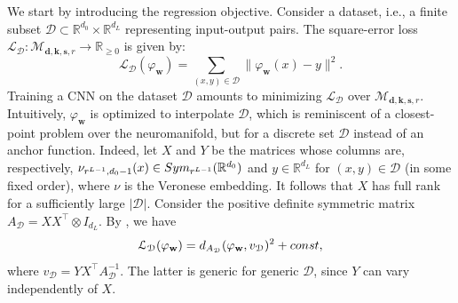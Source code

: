 \documentclass[twoside]{article}
\theoremstyle{plain}%
\theoremstyle{definition}
\theoremstyle{remark}
\newcommand{\symm}[2]{\textnormal{Sym}_{#1}(\mathbb{R}^{#2})}
\begin{document}
We start by introducing the regression objective. Consider a dataset, i.e., a finite subset $\mathcal{D} \subset \mathbb{R}^{d_0} \times \mathbb{R}^{d_L}$ representing input-output pairs. The square-error loss $\mathcal{L}_{\mathcal{D}}\colon \mathcal{M}_{\mathbf{d}, \mathbf{k}, \mathbf{s}, r} \rightarrow \mathbb{R}_{\geq 0}$ is given by: 
\begin{equation}
    \label{eq:loss}
    \mathcal{L}_\mathcal{D}(\varphi_\mathbf{w}) = \sum_{(x,y) \in \mathcal{D}} \| \varphi_{\mathbf{w}}(x) - y \|^2.
\end{equation}
Training a CNN on the dataset $\mathcal{D}$ amounts to minimizing $\mathcal{L}_\mathcal{D}$ over $\mathcal{M}_{\mathbf{d}, \mathbf{k}, \mathbf{s}, r}$. Intuitively, $\varphi_{\mathbf{w}}$ is optimized to interpolate $\mathcal{D}$, which is reminiscent of a closest-point problem over the neuromanifold, but for a discrete set $\mathcal{D}$ instead of an anchor function. Indeed, let $X$ and $Y$ be the matrices whose columns are, respectively, $\nu_{r^{L-1}, d_0 -1}(x) \in \symm{r^{L-1}}{d_0}$ and $y \in \mathbb{R}^{d_L}$ for $(x,y) \in \mathcal{D}$ (in some fixed order), where $\nu$ is the Veronese embedding. It follows that $X$ has full rank for a sufficiently large $|\mathcal{D}|$. Consider the positive definite symmetric matrix $A_\mathcal{D} = XX^\top \otimes I_{d_L}$. By \cite[Section 6]{kohn2022geometry}, we have
\begin{equation}
\label{eq:loss_dist}
 \mathcal{L}_\mathcal{D} (\varphi_\mathbf{w}) =  \textnormal{d}_{A_\mathcal{D}}(\varphi_\mathbf{w}, v_\mathcal{D})^2 + \textnormal{const},
\end{equation}
where $v_\mathcal{D} = YX^\top A_\mathcal{D}^{-1}$. The latter is generic for generic $\mathcal{D}$, since $Y$ can vary independently of $X$. 
\end{document}
